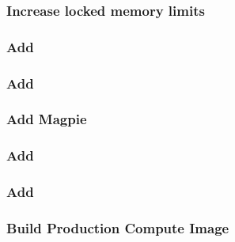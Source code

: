 \documentclass{ohpc-doc}
\begin{document}

\subsubsection{Increase locked memory limits}


%
%
%


\subsubsection{Add \clustershell{}}


\subsubsection{Add \genders{}}


\subsubsection{Add Magpie}



\subsubsection{Add \conman{}} \label{sec:add_conman}


\subsubsection{Add \nhc{}} \label{sec:add_nhc}




\subsubsection{Build Production Compute Image}

\end{document}
